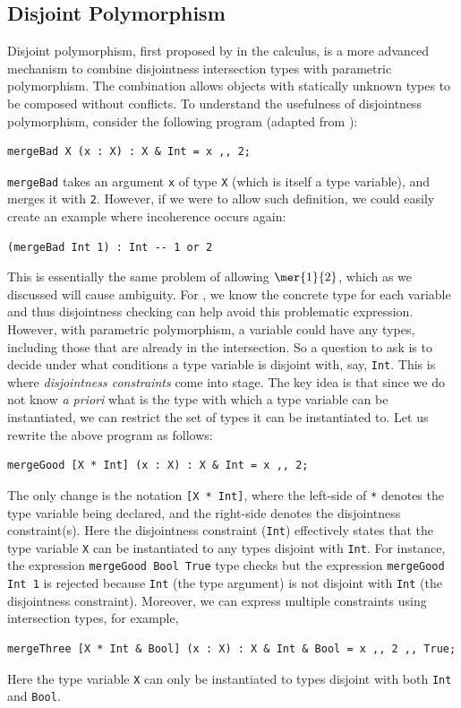 \subsection{Disjoint Polymorphism}
\label{bg:sec:disjoint_poly}


Disjoint polymorphism, first proposed by \citet{alpuimdisjoint} in the \fname
calculus, is a more advanced mechanism to combine disjointness intersection
types with parametric polymorphism. The combination allows objects with
statically unknown types to be composed without conflicts. To understand the
usefulness of disjointness polymorphism, consider the following program (adapted
from \citet{alpuimdisjoint}):
\begin{lstlisting}
mergeBad X (x : X) : X & Int = x ,, 2;
\end{lstlisting}
\lstinline{mergeBad} takes an argument \lstinline{x} of type \lstinline{X} (which is itself a type variable), and merges it with \lstinline{2}.
However, if we were to allow such definition, we could easily create an example where incoherence occurs again:
\begin{lstlisting}
(mergeBad Int 1) : Int -- 1 or 2
\end{lstlisting}
This is essentially the same problem of allowing $\mer{1}{2}$, which as we
discussed will cause ambiguity. For \oname, we
know the concrete type for each variable and thus disjointness checking can help
avoid this problematic expression. However, with parametric polymorphism, a
variable could have any types,
including those that are already in the intersection. So a question to ask is to
decide under what conditions a type variable is disjoint with, say,
\lstinline{Int}. This is where \textit{disjointness constraints} come into stage. The key
idea is that since we do not know \textit{a priori} what is the type with which
a type variable can be instantiated, we can restrict the set of types it can be
instantiated to. Let us rewrite the above program as follows:
\begin{lstlisting}
mergeGood [X * Int] (x : X) : X & Int = x ,, 2;
\end{lstlisting}
The only change is the notation \lstinline{[X * Int]}, where the left-side of
\lstinline{*} denotes the type variable being declared, and the right-side
denotes the disjointness constraint(s). Here the disjointness constraint
(\lstinline{Int}) effectively states that the type variable \lstinline{X} can be
instantiated to any types disjoint with \lstinline{Int}. For instance, the expression \lstinline{mergeGood Bool True}
type checks but the expression \lstinline{mergeGood Int 1}
is rejected because \lstinline{Int} (the type argument) is not disjoint with
\lstinline{Int} (the disjointness constraint). Moreover, we can express multiple
constraints using intersection types, for example,
\begin{lstlisting}
mergeThree [X * Int & Bool] (x : X) : X & Int & Bool = x ,, 2 ,, True;
\end{lstlisting}
Here the type variable \lstinline{X} can only be instantiated to types disjoint with both
\lstinline{Int} and \lstinline{Bool}.



